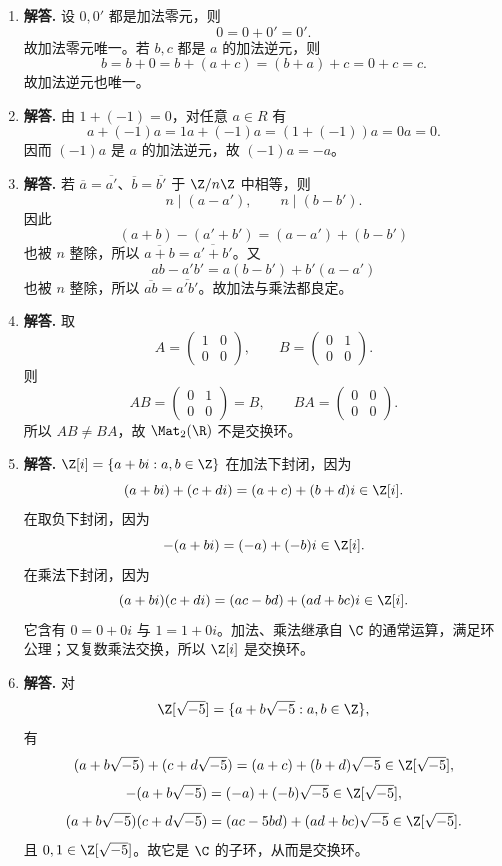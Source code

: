 \begin{enumerate}[label=\textbf{\arabic*.}, leftmargin=*, itemsep=1em]
  \item \textbf{解答.} 设 $0,0'$ 都是加法零元，则
  \[
  0=0+0'=0'.
  \]
  故加法零元唯一。若 $b,c$ 都是 $a$ 的加法逆元，则
  \[
  b=b+0=b+(a+c)=(b+a)+c=0+c=c.
  \]
  故加法逆元也唯一。

  \item \textbf{解答.} 由 $1+(-1)=0$，对任意 $a\in R$ 有
  \[
  a+(-1)a=1a+(-1)a=(1+(-1))a=0a=0.
  \]
  因而 $(-1)a$ 是 $a$ 的加法逆元，故 $(-1)a=-a$。

  \item \textbf{解答.} 若 $\overline a=\overline{a'}$、$\overline b=\overline{b'}$ 于 $\Z/n\Z$ 中相等，则
  \[
  n\mid(a-a'),\qquad n\mid(b-b').
  \]
  因此
  \[
  (a+b)-(a'+b')=(a-a')+(b-b')
  \]
  也被 $n$ 整除，所以 $\overline{a+b}=\overline{a'+b'}$。又
  \[
  ab-a'b'=a(b-b')+b'(a-a')
  \]
  也被 $n$ 整除，所以 $\overline{ab}=\overline{a'b'}$。故加法与乘法都良定。

  \item \textbf{解答.} 取
  \[
  A=\begin{pmatrix}1&0\\0&0\end{pmatrix},\qquad
  B=\begin{pmatrix}0&1\\0&0\end{pmatrix}.
  \]
  则
  \[
  AB=\begin{pmatrix}0&1\\0&0\end{pmatrix}=B,\qquad
  BA=\begin{pmatrix}0&0\\0&0\end{pmatrix}.
  \]
  所以 $AB\neq BA$，故 $\Mat_2(\R)$ 不是交换环。

  \item \textbf{解答.} $\Z[i]=\{a+bi:a,b\in\Z\}$ 在加法下封闭，因为
  \[
  (a+bi)+(c+di)=(a+c)+(b+d)i\in\Z[i].
  \]
  在取负下封闭，因为
  \[
  -(a+bi)=(-a)+(-b)i\in\Z[i].
  \]
  在乘法下封闭，因为
  \[
  (a+bi)(c+di)=(ac-bd)+(ad+bc)i\in\Z[i].
  \]
  它含有 $0=0+0i$ 与 $1=1+0i$。加法、乘法继承自 $\C$ 的通常运算，满足环公理；又复数乘法交换，所以 $\Z[i]$ 是交换环。

  \item \textbf{解答.} 对
  \[
  \Z[\sqrt{-5}]=\{a+b\sqrt{-5}:a,b\in\Z\},
  \]
  有
  \[
  (a+b\sqrt{-5})+(c+d\sqrt{-5})=(a+c)+(b+d)\sqrt{-5}\in\Z[\sqrt{-5}],
  \]
  \[
  -(a+b\sqrt{-5})=(-a)+(-b)\sqrt{-5}\in\Z[\sqrt{-5}],
  \]
  \[
  (a+b\sqrt{-5})(c+d\sqrt{-5})=(ac-5bd)+(ad+bc)\sqrt{-5}\in\Z[\sqrt{-5}].
  \]
  且 $0,1\in \Z[\sqrt{-5}]$。故它是 $\C$ 的子环，从而是交换环。


\end{enumerate}
